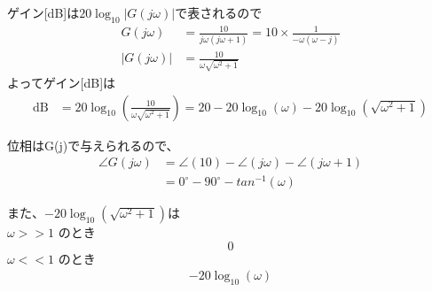 \documentclass[a4paper,12pt]{article}
\begin{document}
\begin{tcolorbox}[title={7. \(G(s)=\dfrac{10}{s(s+1)}\)について、周波数応答関数、ゲイン(dB)、位相(deg.)を求めよ。
また、漸近線を用いてボード線図の概形を描け。各軸には適宜数値を記入し、折れ点等の特徴点を明示すること。}]

ゲイン[dB]は\(20\log_{10} \left| G(j\omega) \right|\)で表されるので\\
\vspace{-6mm}
\begin{align*}
    G(j\omega) &= \frac{10}{j\omega(j\omega + 1)} = 10 \times \frac{1}{-\omega(\omega - j)} \\
    \left| G(j\omega) \right| &= \frac{10}{\omega \sqrt{\omega^2 + 1}}
\end{align*}
よってゲイン[dB]は\\
\vspace{-6mm}
\begin{align*}
\mathrm{dB} &= 20 \log_{10} \left( \frac{10}{\omega \sqrt{\omega^2 + 1}} \right)
=20 -20 \log_{10} \left( \omega \right) - 20 \log_{10} \left( \sqrt{\omega^2 + 1}\right)
\end{align*}

位相は\angle G(j\omega)で与えられるので、
\begin{align*}
\angle G(j\omega) &= \angle (10) - \angle (j\omega) - \angle (j\omega + 1)\\
                &= 0^\circ - 90^\circ- tan^{-1}(\omega)
\end{align*}



\begin{minipage}{0.45\linewidth}
\vspace{-24mm}
また、\(- 20 \log_{10} \left( \sqrt{\omega^2 + 1}\right)\)は\\
\(\omega >> 1\) のとき
\[
    0
\]
\(\omega << 1\) のとき
\begin{align*}
    - 20 \log_{10} \left(  \omega \right)
\end{align*}
\end{minipage}
\hfill
\begin{minipage}{0.5\linewidth}
\begin{center}
\end{center}
\end{minipage}
\end{tcolorbox}
\end{document}
